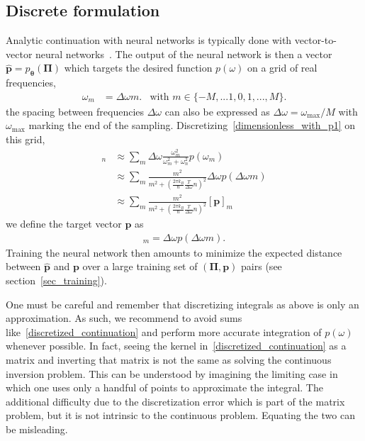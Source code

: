 \documentclass[notitlepage,11pt,nofootinbib]{revtex4-1}
\renewcommand{\vec}[1]{\bm{#1}}
\begin{document}
\subsection{Discrete formulation}
\label{section_discrete}

Analytic continuation with neural networks is typically done with vector-to-vector neural networks~\cite{Fournier2020,Xie2019,Yoon2018,Kades2019}. The output of the neural network is then a vector $\hat{\vec p} = p_{\vec \theta}(\vec \Pi)$ which targets the desired function $p(\omega)$ on a grid of real frequencies,
\begin{align}
\omega_m &=
\Delta\omega m.
&\text{with }m\in\{-M,...1,0,1,...,M\}.
\label{eq_discrete_grid}
\end{align}
the spacing between frequencies $\Delta \omega$ can also be expressed as $\Delta\omega =\omega_{\text{max}}/M$ with $\omega_{\text{max}}$ marking the end of the sampling. Discretizing~\eqref{dimensionless_with_p1} on this grid,\begin{align}
[\vec \Pi]_n
&\approx
\sum_{m}
\Delta\omega \frac{\omega_m^2}{\omega_m^2+\omega_n^2} p(\omega_m)
\label{discretized_continuation_1}
\\
&\approx
\sum_{m}
\frac{m^2}{m^2+(\frac{2\pi k_B}{\hbar}\frac{T}{\Delta\omega}n)^2} \Delta\omega p(\Delta\omega m)
\\
&\approx
\sum_{m}
\frac{m^2}{m^2+(\frac{2\pi k_B}{\hbar}\frac{T}{\Delta\omega}n)^2} 
[\vec p]_m
\label{discretized_continuation}
\end{align}
we define the target vector $\vec p$ as
\begin{align}
    [\vec p]_m = \Delta\omega p(\Delta\omega m).
\end{align}
Training the neural network then amounts to minimize the expected distance between $\hat{\vec p}$ and $\vec p$ over a large training set of $(\vec \Pi,\vec p)$ pairs (see section~\ref{sec_training}).

One must be careful and remember that discretizing integrals as above is only an approximation. 
As such, we recommend to avoid sums like~\eqref{discretized_continuation} and perform more accurate integration of $p(\omega)$ whenever possible.
In fact, seeing the kernel in~\eqref{discretized_continuation} as a matrix and inverting that matrix is not the same as solving the continuous inversion problem. This can be understood by imagining the limiting case in which one uses only a handful of points to approximate the integral. The additional difficulty due to the discretization error which is part of the matrix problem, but it is not intrinsic to the continuous problem. Equating the two can be misleading.
\end{document}
